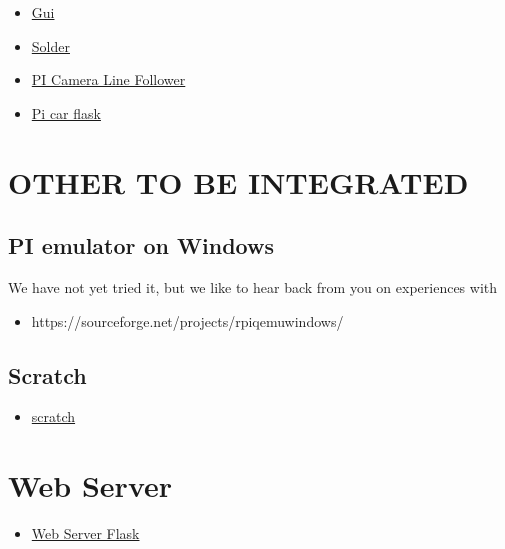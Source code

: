 \begin{itemize}

\item
  \href{https://www.raspberrypi.org/learning/getting-started-with-guis/worksheet/}{Gui}\\
\item
  \href{https://www.raspberrypi.org/learning/getting-started-with-guis/}{Solder}\\
\item
  \href{https://www.raspberrypi.org/blog/an-image-processing-robot-for-robocup-junior/}{PI
  Camera Line Follower}\\
\item
  \href{https://circuitdigest.com/microcontroller-projects/web-controlled-raspberry-pi-surveillance-robot}{Pi
  car flask}
\end{itemize}

\section{OTHER TO BE INTEGRATED}\label{other-to-be-integrated}

\subsection{PI emulator on Windows}\label{pi-emulator-on-windows}

We have not yet tried it, but we like to hear back from you on
experiences with

\begin{itemize}

\item
  https://sourceforge.net/projects/rpiqemuwindows/
\end{itemize}

\subsection{Scratch}\label{scratch}

\begin{itemize}

\item
  \href{https://github.com/DexterInd/GrovePi/tree/master/Software/Scratch}{scratch}
\end{itemize}

\section{Web Server}\label{web-server}

\begin{itemize}

\item
  \href{https://www.raspberrypi.org/learning/python-web-server-with-flask/worksheet/}{Web
  Server Flask}
\end{itemize}
